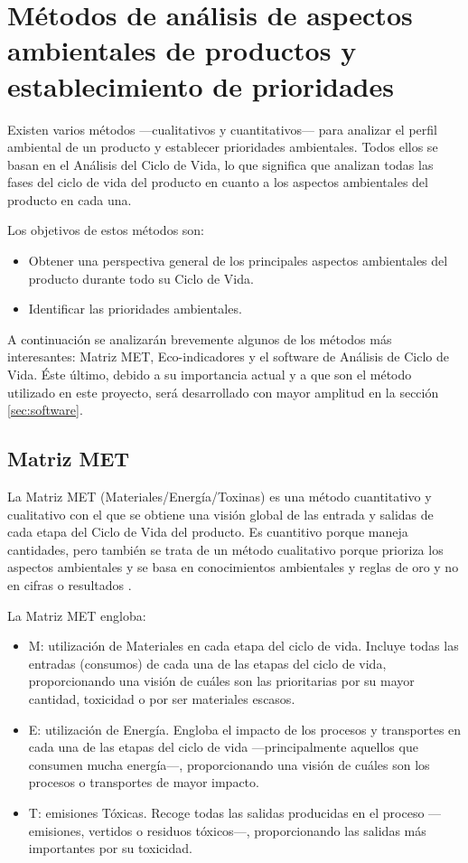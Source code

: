 \section{Métodos de análisis de aspectos ambientales de productos y establecimiento de prioridades}

Existen varios métodos —cualitativos y cuantitativos— para analizar el perfil ambiental de un producto y establecer prioridades ambientales. Todos ellos se basan en el Análisis del Ciclo de Vida, lo que significa que analizan todas las fases del ciclo de vida del producto en cuanto a los aspectos ambientales del producto en cada una.

Los objetivos de estos métodos son:
\begin{itemize}
  \item Obtener una perspectiva general de los principales aspectos ambientales del producto durante todo su Ciclo de Vida.
  \item Identificar las prioridades ambientales.
\end{itemize}

A continuación se analizarán brevemente algunos de los métodos más interesantes: Matriz MET, Eco-indicadores y el software de Análisis de Ciclo de Vida. Éste último, debido a su importancia actual y a que son el método utilizado en este proyecto, será desarrollado con mayor amplitud en la sección \ref{sec:software}.

\subsection{Matriz MET}

La Matriz MET (Materiales/Energía/Toxinas) es una método cuantitativo y cualitativo con el que se obtiene una visión global de las entrada y salidas de cada etapa del Ciclo de Vida del producto. Es cuantitivo porque maneja cantidades, pero también se trata de un método cualitativo porque prioriza los aspectos ambientales y se basa en conocimientos ambientales y reglas de oro y no en cifras o resultados \cite{ihobeeco}.

La Matriz MET engloba:
\begin{itemize}
  \item M: utilización de Materiales en cada etapa del ciclo de vida. Incluye todas las entradas (consumos) de cada una de las etapas del ciclo de vida, proporcionando una visión de cuáles son las prioritarias por su mayor cantidad, toxicidad o por ser materiales escasos.
  \item E: utilización de Energía. Engloba el impacto de los procesos y transportes en cada una de las etapas del ciclo de vida —principalmente aquellos que consumen mucha energía—, proporcionando una visión de cuáles son los procesos o transportes de mayor impacto.
  \item T: emisiones Tóxicas. Recoge todas las salidas producidas en el proceso —emisiones, vertidos o residuos tóxicos—, proporcionando las salidas más importantes por su toxicidad.
\end{itemize}

